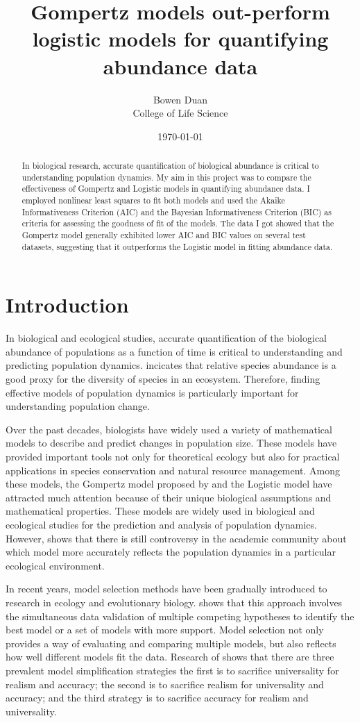 \documentclass[11pt]{article}
\title{Gompertz models out-perform logistic models for quantifying abundance data}
\author{Bowen Duan \\ College of Life Science}
\date{\today}
\begin{document}
\maketitle

\begin{abstract}
 In biological research, accurate quantification of biological abundance is critical to understanding population dynamics. My aim in this project was to compare the effectiveness of Gompertz and Logistic models in quantifying abundance data. I employed nonlinear least squares to fit both models and used the Akaike Informativeness Criterion (AIC) and the Bayesian Informativeness Criterion (BIC) as criteria for assessing the goodness of fit of the models. The data I got showed that the Gompertz model generally exhibited lower AIC and BIC values on several test datasets, suggesting that it outperforms the Logistic model in fitting abundance data.
\end{abstract}

\section{Introduction}
\quad In biological and ecological studies, accurate quantification of the biological abundance of populations as a function of time is critical to understanding and predicting population dynamics. \cite{preston1948commonness} incicates that relative species abundance is a good proxy for the diversity of species in an ecosystem. Therefore, finding effective models of population dynamics is particularly important for understanding population change.

Over the past decades, biologists have widely used a variety of mathematical models to describe and predict changes in population size. These models have provided important tools not only for theoretical ecology but also for practical applications in species conservation and natural resource management. Among these models, the Gompertz model proposed by \cite{zwietering1990modeling} and the Logistic model have attracted much attention because of their unique biological assumptions and mathematical properties. These models are widely used in biological and ecological studies for the prediction and analysis of population dynamics. However,\cite{johnson2004model} shows that there is still controversy in the academic community about which model more accurately reflects the population dynamics in a particular ecological environment.

In recent years, model selection methods have been gradually introduced to research in ecology and evolutionary biology. \cite{johnson2004model} shows that this approach involves the simultaneous data validation of multiple competing hypotheses to identify the best model or a set of models with more support. Model selection not only provides a way of evaluating and comparing multiple models, but also reflects how well different models fit the data. Research of \cite{levins1966strategy} shows that there are three prevalent model simplification strategies the first is to sacrifice universality for realism and accuracy; the second is to sacrifice realism for universality and accuracy; and the third strategy is to sacrifice accuracy for realism and universality.
\end{document}
